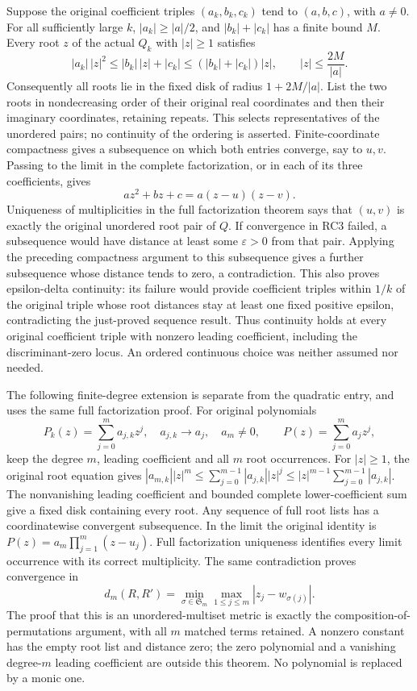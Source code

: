 \documentclass[
  11pt,
]{article}
\begin{document}
Suppose the original coefficient triples \((a_k,b_k,c_k)\) tend to
\((a,b,c)\), with \(a\ne0\). For all sufficiently large \(k\),
\(|a_k|\geq|a|/2\), and \(|b_k|+|c_k|\) has a finite bound \(M\). Every
root \(z\) of the actual \(Q_k\) with \(|z|\geq1\) satisfies \[
 |a_k|\,|z|^2\leq |b_k|\,|z|+|c_k|
       \leq (|b_k|+|c_k|)|z|,\qquad
 |z|\leq\frac{2M}{|a|}.
 \tag{RC4}
\] Consequently all roots lie in the fixed disk of radius \(1+2M/|a|\).
List the two roots in nondecreasing order of their original real
coordinates and then their imaginary coordinates, retaining repeats.
This selects representatives of the unordered pairs; no continuity of
the ordering is asserted. Finite-coordinate compactness gives a
subsequence on which both entries converge, say to \(u,v\). Passing to
the limit in the complete factorization, or in each of its three
coefficients, gives \[
 az^2+bz+c=a(z-u)(z-v).
 \tag{RC5}
\] Uniqueness of multiplicities in the full factorization theorem says
that \((u,v)\) is exactly the original unordered root pair of \(Q\). If
convergence in RC3 failed, a subsequence would have distance at least
some \(\varepsilon>0\) from that pair. Applying the preceding
compactness argument to this subsequence gives a further subsequence
whose distance tends to zero, a contradiction. This also proves
epsilon-delta continuity: its failure would provide coefficient triples
within \(1/k\) of the original triple whose root distances stay at least
one fixed positive epsilon, contradicting the just-proved sequence
result. Thus continuity holds at every original coefficient triple with
nonzero leading coefficient, including the discriminant-zero locus. An
ordered continuous choice was neither assumed nor needed.

The following finite-degree extension is separate from the quadratic
entry, and uses the same full factorization proof. For original
polynomials \[
 P_k(z)=\sum_{j=0}^m a_{j,k}z^j,\quad
 a_{j,k}\longrightarrow a_j,\quad a_m\ne0,\qquad
 P(z)=\sum_{j=0}^m a_jz^j,
 \tag{RC6}
\] keep the degree \(m\), leading coefficient and all \(m\) root
occurrences. For \(|z|\geq1\), the original root equation gives
\( |a_{m,k}||z|^m\leq\sum_{j=0}^{m-1}|a_{j,k}||z|^j
\leq |z|^{m-1}\sum_{j=0}^{m-1}|a_{j,k}|\). The nonvanishing leading
coefficient and bounded complete lower-coefficient sum give a fixed disk
containing every root. Any sequence of full root lists has a
coordinatewise convergent subsequence. In the limit the original
identity is \(P(z)=a_m\prod_{j=1}^m(z-u_j)\). Full factorization
uniqueness identifies every limit occurrence with its correct
multiplicity. The same contradiction proves convergence in \[
 d_m(R,R')=\min_{\sigma\in\mathfrak S_m}
                \max_{1\leq j\leq m}|z_j-w_{\sigma(j)}|.
 \tag{RC7}
\] The proof that this is an unordered-multiset metric is exactly the
composition-of-permutations argument, with all \(m\) matched terms
retained. A nonzero constant has the empty root list and distance zero;
the zero polynomial and a vanishing degree-\(m\) leading coefficient are
outside this theorem. No polynomial is replaced by a monic one.
\end{document}

